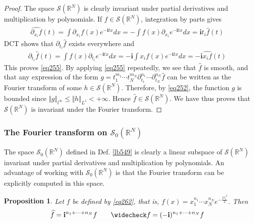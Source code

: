 \documentclass[12pt,b5paper,notitlepage]{article}
\theoremstyle{definition}
\theoremstyle{plain}
\newtheorem{pp}[df]{Proposition}
\newcommand{\wht}{\widehat}
\newcommand{\wch}{\widecheck}
\newcommand{\im}{\mathbf{i}}
\newcommand{\Rbb}{\mathbb R}
\newcommand{\MS}{\mathcal S}
\numberwithin{equation}{section}
\begin{document}
\begin{proof}
The space $\MS(\Rbb^N)$ is clearly invariant under partial derivatives and multiplication by polynomials. If $f\in\MS(\Rbb^N)$, integration by parts gives
\begin{align*}
\wht{\partial_{x_i}f}(t)=\int \partial_{x_i}f(x)e^{-\im tx}dx=-\int f(x)\partial_{x_i}e^{-\im tx}dx=\im t_i \wht f(t)
\end{align*} 
DCT shows that $\partial_{t_i}\wht f$ exists everywhere and
\begin{align*}
\partial_{t_i}\wht f(t)=\int f(x)\partial_{t_i}e^{-\im tx}dx=-\im\int x_if(x)e^{-\im tx}dx=-\im\wht{x_if}(t)
\end{align*}
This proves \eqref{eq255}. By applying \eqref{eq255} repeatedly, we see that $\wht f$ is smooth, and that any expression of the form $g=t_1^{m_1}\cdots t_N^{m_N}\partial_{t_1}^{n_1}\cdots \partial_{t_N}^{n_N}\wht f$ can be written as the Fourier transform of some $h\in \MS(\Rbb^N)$. Therefore, by \eqref{eq252}, the function $g$ is bounded since $\Vert g\Vert_{l^\infty}\leq\Vert h\Vert_{L^1}<+\infty$. Hence $\wht f\in\MS(\Rbb^N)$. We have thus proves that $\MS(\Rbb^N)$ is invariant under the Fourier transform.
\end{proof}



\subsubsection{The Fourier transform on $\MS_0(\Rbb^N)$}



The space $\MS_0(\Rbb^N)$ defined in Def. \ref{lb549} is clearly a linear subspace of $\MS(\Rbb^N)$ invariant under partial derivatives and multiplication by polynomials. An advantage of working with $\MS_0(\Rbb^N)$ is that the Fourier transform can be explicitly computed in this space.


\begin{pp}\label{lb511}
Let $f$ be defined by \eqref{eq262}, that is, $f(x)=x_1^{n_1}\cdots x_N^{n_N}e^{-\frac{|x|^2}2}$. Then
\begin{gather*}
\wht f=\im^{n_1+\cdots+n_N} f\qquad \wch f=(-\im)^{n_1+\cdots+n_N}f
\end{gather*}
\end{pp}
\end{document}

